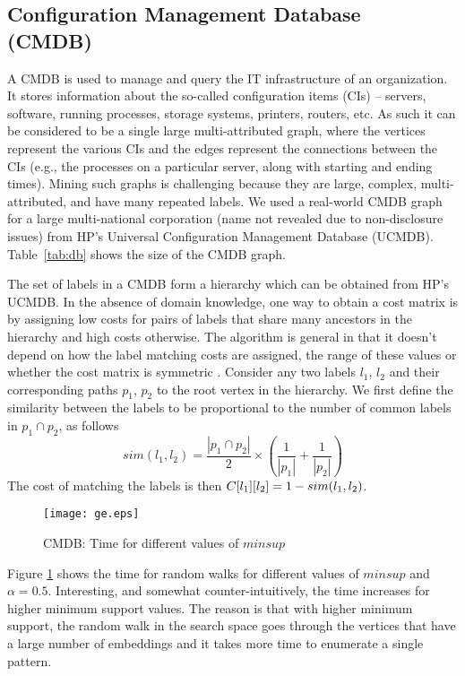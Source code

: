 \subsection{Configuration Management Database\\ (CMDB)} 

A CMDB is used to manage and query the IT infrastructure of an
organization. It stores information about the so-called configuration
items (CIs) -- servers, software, running processes, storage systems,
printers, routers, etc. As such it can be considered to be a single
large multi-attributed graph, where the vertices represent the various CIs
and the edges represent the connections between the CIs (e.g., the
processes on a particular server, along with starting and ending times).
Mining such graphs is challenging because they are large, complex,
multi-attributed, and have many repeated labels.  We used a real-world
CMDB graph for a large multi-national corporation (name not revealed due
to non-disclosure issues) from HP's Universal Configuration Management
Database (UCMDB).  Table~\ref{tab:db} shows the size of the CMDB graph. 


\smallskip{} 
The set of labels in a CMDB form a
hierarchy which can be obtained from HP's UCMDB. In the absence of
domain knowledge, one way to obtain a cost matrix is by assigning low
costs for pairs of labels that share many ancestors in the hierarchy and
high costs otherwise. The algorithm is general in that it doesn't depend
on how the label matching costs are assigned, the range of these
values or whether the cost matrix is symmetric
.  Consider any two labels $l_1$, $l_2$ and their corresponding
paths $p_1$, $p_2$ to the root vertex in the hierarchy.  We first define
the similarity between the labels to be proportional to the number of
common labels in $p_1 \cap p_2$, as follows
\begin{equation*}
  sim(l_1,l_2) =  \frac{|p_1 \cap p_2|}{2} \times 
  \left(\frac{1}{|p_1|} + \frac{1}{|p_2|}\right)
\end{equation*}
The cost of matching the labels is then 
${C}[l_1][l_2] = 1 - sim(l_1,l_2)$.

\begin{figure}[!ht]
  \centerline{
    \texttt{[image: ge.eps]}
	}
    \caption{CMDB: Time for different values of
	$minsup$}
    \label{fig:ge}
\end{figure}


\smallskip{} Figure \ref{fig:ge} shows the
time for random walks for different values of $minsup$ and $\alpha =
0.5$. Interesting, and somewhat counter-intuitively, the time increases
for higher minimum support values.  The reason is that with higher
minimum support, the random walk in the search space goes through the
vertices that have a large number of embeddings and it takes more time to
enumerate a single pattern.

